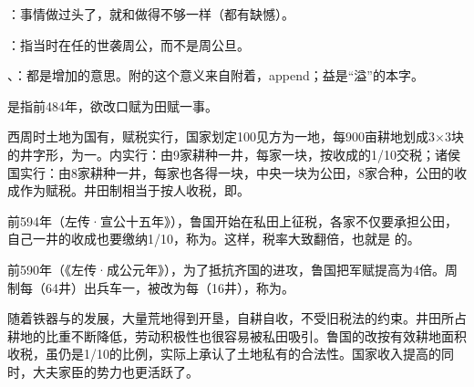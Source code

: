{
\item {}：事情做过头了，就和做得不够一样（都有缺憾）。
}
{}  %


{
\item {}：指当时在任的世袭周公，而不是周公旦。
\item {}、：都是增加的意思。附的这个意义来自附着，append；益是“溢”的本字。

是指前484年，欲改口赋为田赋一事。
\begin{lyitemize}
\item {}西周时土地为国有，赋税实行，国家划定100见方为一地，每900亩耕地划成3×3块的井字形，为一。内实行：由9家耕种一井，每家一块，按收成的1/10交税；诸侯国实行：由8家耕种一井，每家也各得一块，中央一块为公田，8家合种，公田的收成作为赋税。井田制相当于按人收税，即。

\item {}前594年（左传·宣公十五年》），鲁国开始在私田上征税，各家不仅要承担公田，自己一井的收成也要缴纳1/10，称为。这样，税率大致翻倍，也就是  的。

\item {}前590年（《左传·成公元年》），为了抵抗齐国的进攻，鲁国把军赋提高为4倍。周制每（64井）出兵车一，被改为每（16井），称为。

\item {}随着铁器与的发展，大量荒地得到开垦，自耕自收，不受旧税法的约束。井田所占耕地的比重不断降低，劳动积极性也很容易被私田吸引。鲁国的改按有效耕地面积收税，虽仍是1/10的比例，实际上承认了土地私有的合法性。国家收入提高的同时，大夫家臣的势力也更活跃了。
\end{lyitemize}

}
